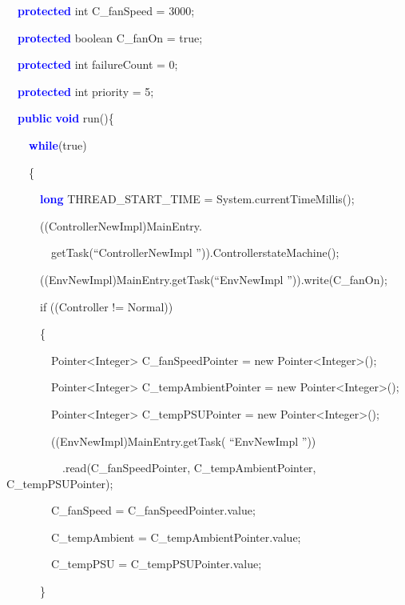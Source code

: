 \documentclass{llncs}%
\begin{document}
{\ttfamily
\ \ \textbf{\textcolor{blue}{protected}} int C\_fanSpeed = 3000;}

{\ttfamily
\ \ \textbf{\textcolor{blue}{protected}} boolean C\_fanOn = true;}

{\ttfamily
\ \ \textbf{\textcolor{blue}{protected}} int failureCount = 0;}

{\ttfamily
\ \ \textbf{\textcolor{blue}{protected}} int priority = 5;}


\bigskip

{\ttfamily
\ \ \textbf{\textcolor{blue}{public}} \textbf{\textcolor{blue}{void}}
run()\{}

{\ttfamily
\ \ \ \ \textbf{\textcolor{blue}{while}}(true)}

{\ttfamily
\ \ \ \ \{}

{\ttfamily
\ \ \ \ \ \ \textbf{\textcolor{blue}{long}} THREAD\_START\_TIME =
System.currentTimeMillis();}

{\ttfamily
\ \ \ \ \ \ ((ControllerNewImpl)MainEntry.}

{\ttfamily
\ \ \ \ \ \ \ \ getTask(``ControllerNewImpl '')).ControllerstateMachine();}

{\ttfamily
\ \ \ \ \ \ ((EnvNewImpl)MainEntry.getTask(``EnvNewImpl '')).write(C\_fanOn);}

{\ttfamily
\ \ \ \ \ \ if ((Controller != Normal))}

{\ttfamily
\ \ \ \ \ \ \{}

{\ttfamily
\ \ \ \ \ \ \ \ Pointer{\textless}Integer{\textgreater}
C\_fanSpeedPointer = new Pointer{\textless}Integer{\textgreater}();}

{\ttfamily
\ \ \ \ \ \ \ \ Pointer{\textless}Integer{\textgreater}
C\_tempAmbientPointer = new Pointer{\textless}Integer{\textgreater}();}

{\ttfamily
\ \ \ \ \ \ \ \ Pointer{\textless}Integer{\textgreater}
C\_tempPSUPointer = new Pointer{\textless}Integer{\textgreater}();}

{\ttfamily
\ \ \ \ \ \ \ \ ((EnvNewImpl)MainEntry.getTask( ``EnvNewImpl ''))}

{\ttfamily
\ \ \ \ \ \ \ \ \ \ .read(C\_fanSpeedPointer, C\_tempAmbientPointer,
C\_tempPSUPointer);}

{\ttfamily
\ \ \ \ \ \ \ \ C\_fanSpeed = C\_fanSpeedPointer.value;}

{\ttfamily
\ \ \ \ \ \ \ \ C\_tempAmbient = C\_tempAmbientPointer.value;}

{\ttfamily
\ \ \ \ \ \ \ \ C\_tempPSU = C\_tempPSUPointer.value;}

{\ttfamily
\ \ \ \ \ \ \}}
\end{document}
